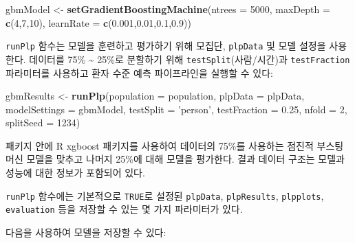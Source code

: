 \documentclass[10.5pt]{book}
\newenvironment{Shaded}{\begin{snugshade}}{\end{snugshade}}
\newcommand{\KeywordTok}[1]{\textcolor[rgb]{0.13,0.29,0.53}{\textbf{#1}}}
\newcommand{\DataTypeTok}[1]{\textcolor[rgb]{0.13,0.29,0.53}{#1}}
\newcommand{\DecValTok}[1]{\textcolor[rgb]{0.00,0.00,0.81}{#1}}
\newcommand{\FloatTok}[1]{\textcolor[rgb]{0.00,0.00,0.81}{#1}}
\newcommand{\StringTok}[1]{\textcolor[rgb]{0.31,0.60,0.02}{#1}}
\newcommand{\OperatorTok}[1]{\textcolor[rgb]{0.81,0.36,0.00}{\textbf{#1}}}
\newcommand{\NormalTok}[1]{#1}
\theoremstyle{definition}
\theoremstyle{definition}
\theoremstyle{definition}
\theoremstyle{remark}
\begin{document}
\begin{Shaded}
\begin{Highlighting}[]
\NormalTok{gbmModel <-}\StringTok{ }\KeywordTok{setGradientBoostingMachine}\NormalTok{(}\DataTypeTok{ntrees =} \DecValTok{5000}\NormalTok{,}
                                       \DataTypeTok{maxDepth =} \KeywordTok{c}\NormalTok{(}\DecValTok{4}\NormalTok{,}\DecValTok{7}\NormalTok{,}\DecValTok{10}\NormalTok{),}
                                       \DataTypeTok{learnRate =} \KeywordTok{c}\NormalTok{(}\FloatTok{0.001}\NormalTok{,}\FloatTok{0.01}\NormalTok{,}\FloatTok{0.1}\NormalTok{,}\FloatTok{0.9}\NormalTok{))}
\end{Highlighting}
\end{Shaded}

\texttt{runPlp} 함수는 모델을 훈련하고 평가하기 위해 모집단,
\texttt{plpData} 및 모델 설정을 사용한다. 데이터를 75\%
\textasciitilde{} 25\%로 분할하기 위해 \texttt{testSplit}(사람/시간)과
\texttt{testFraction} 파라미터를 사용하고 환자 수준 예측 파이프라인을
실행할 수 있다:

\begin{Shaded}
\begin{Highlighting}[]
\NormalTok{gbmResults <-}\StringTok{ }\KeywordTok{runPlp}\NormalTok{(}\DataTypeTok{population =}\NormalTok{ population,}
                     \DataTypeTok{plpData =}\NormalTok{ plpData,}
                     \DataTypeTok{modelSettings =}\NormalTok{ gbmModel,}
                     \DataTypeTok{testSplit =} \StringTok{'person'}\NormalTok{,}
                     \DataTypeTok{testFraction =} \FloatTok{0.25}\NormalTok{,}
                     \DataTypeTok{nfold =} \DecValTok{2}\NormalTok{,}
                     \DataTypeTok{splitSeed =} \DecValTok{1234}\NormalTok{)}
\end{Highlighting}
\end{Shaded}

패키지 안에 R xgboost 패키지를 사용하여 데이터의 75\%를 사용하는 점진적
부스팅 머신 모델을 맞추고 나머지 25\%에 대해 모델을 평가한다. 결과
데이터 구조는 모델과 성능에 대한 정보가 포함되어 있다.

\texttt{runPlp} 함수에는 기본적으로 \texttt{TRUE}로 설정된
\texttt{plpData}, \texttt{plpResults}, \texttt{plpplots},
\texttt{evaluation} 등을 저장할 수 있는 몇 가지 파라미터가 있다.

다음을 사용하여 모델을 저장할 수 있다:

\begin{Shaded}
\end{Shaded}
\end{document}
